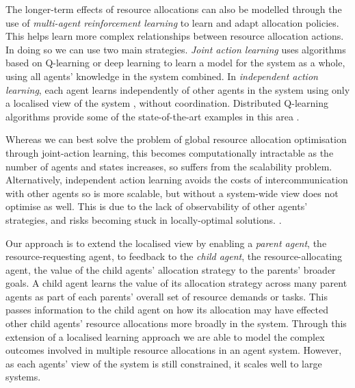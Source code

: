 The longer-term effects of resource allocations can also be modelled through the use of \textit{multi-agent reinforcement learning} \cite{Busoniu2008a} to learn and adapt allocation policies. This helps learn more complex relationships between resource allocation actions. In doing so we can use two main strategies. \textit{Joint action learning} uses algorithms based on Q-learning or deep learning to learn a model for the system as a whole, using all agents' knowledge in the system combined. In \textit{independent action learning}, each agent learns independently of other agents in the system using only a localised view of the system \cite{Claus}, without coordination. Distributed Q-learning algorithms provide some of the state-of-the-art examples in this area  \cite{Lauer00analgorithm, 4399095}.

Whereas we can best solve the problem of global resource allocation optimisation through joint-action learning, this becomes computationally intractable as the number of agents and states increases, so suffers from the scalability problem. Alternatively, independent action learning avoids the costs of intercommunication with other agents so is more scalable, but without a system-wide view does not optimise as well. This is due to the lack of observability of other agents' strategies, and risks becoming stuck in locally-optimal solutions. \cite{Fatima2001,Hernandez-Leal2019a, Shyalika2020}. 

Our approach is to extend the localised view by enabling a \textit{parent agent}, the resource-requesting agent, to feedback to the \textit{child agent}, the resource-allocating agent, the value of the child agents' allocation strategy to the parents' broader goals. A child agent learns the value of its allocation strategy across many parent agents as part of each parents' overall set of resource demands or tasks. This passes information to the child agent on how its allocation may have effected other child agents' resource allocations more broadly in the system. Through this extension of a localised learning approach we are able to model the complex outcomes involved in multiple resource allocations in an agent system. However, as each agents' view of the system is still constrained, it scales well to large systems. 







